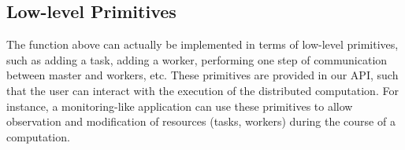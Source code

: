 \documentclass{llncs}
\newcommand{\Ocaml}{OCaml}
\begin{document}
\begin{comment}
When master and worker programs are compiled with different
versions of the \Ocaml\ compiler, our library still provides
a monomorphic API over strings. As a consequence, we need to convert
integers to and from strings in both master and worker.
The modified worker program is as follows:
\begin{ocaml}
  open Mono
  let worker i = ...
  let worker_string i = string_of_int (worker (int_of_string i))
  let () = Worker.compute worker_string ()
\end{ocaml}
The master program is modified in a similar way.
We simply replace \of{Poly} with \of{Mono} and encode/decode integers
as strings, as follows:
\begin{ocaml}
  let tasks = 
    let l = ref [] in 
    for i = 0 to n do l := (string_of_int i, ()) :: !l done; 
    !l
  let master (i,()) fi = s := !s + int_of_string fi; []
\end{ocaml}
\end{comment}

\subsection{Low-level Primitives}


The function  above can actually be implemented in terms
of low-level primitives, such as adding a task, adding a worker,
performing one step of communication between master and workers, etc.
These primitives are provided in our API, such that the user can
interact with the execution of the distributed computation.  For
instance, a monitoring-like application can use these primitives to
allow observation and modification of resources (tasks, workers)
during the course of a computation.
\end{document}
